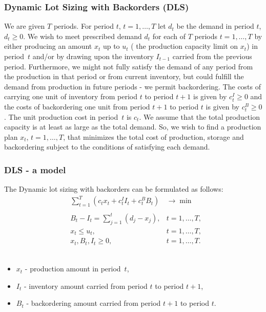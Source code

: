 \documentclass[landscape]{beamer}
\begin{document}
\begin{frame}[fragile]
  \frametitle{Dynamic Lot Sizing with Backorders (DLS)}
\begin{small}  
We are given $T$ periods. For period $t$, $t=1,\ldots, T$ let $d_t$ be the demand 
in period $t$, $d_t\geq 0$.
We wish to meet prescribed demand $d_t$ for each of $T$ periods $t=1,\ldots, T$
by either producing an amount $x_t$ up to $u_t$ ( the production capacity limit on $x_t$) 
in period~$t$  and/or by
drawing upon the inventory $I_{t-1}$ carried from the previous period.
Furthermore, we might not fully
satisfy the demand of any period from the production in that period or from current
inventory, but could fulfill the demand from production in future periods -
we permit backordering.
The costs of carrying one unit of inventory from period $t$ to period $t+1$
 is given by $c^I_t \geq 0$ 
 and the costs of backordering one unit from period $t+1$ to period $t$ is given by 
$c^B_t \geq 0$.
The unit production cost in period~$t$ is $c_t$. We assume that
the total production capacity is at least
as large as the total demand.
So, we wish to find a production plan $x_t$, $t=1,\ldots,T$,
that minimizes the total cost of production, storage and backordering subject 
to the conditions of satisfying each demand.
\end{small}
\end{frame}

\begin{frame}[fragile]
  \frametitle{DLS  - a model}
\begin{small} 
The Dynamic lot sizing with backorders can be formulated as follows:
\[
 \begin{array}{lll}
 &\sum_{t=1}^{T}(c_t x_t+c^I_t I_t+ c^B_t B_t)&\rightarrow \min\\
 &&\\
 & B_t- I_t=\sum_{j=1}^{t}(d_j-x_j), & t=1,\ldots,T,\\
       &x_t\leq u_t,  &t=1,\ldots,T,\\
       &x_t,B_t,I_t\geq 0,  &t=1,\ldots,T.
 \end{array}
 \]
 \\
\begin{itemize}
\item $x_t$  - production amount in period~$t$,
\item $I_t$  - inventory amount carried from period $t$ to period $t+1$,
\item $B_t$ - backordering amount carried from period $t+1$ to period $t$.
\end{itemize}
\end{small}
\end{frame}
\end{document}
